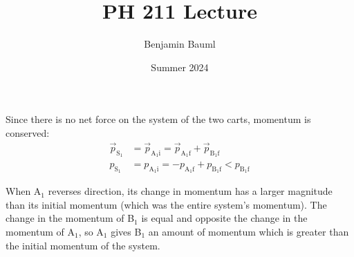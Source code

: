 \documentclass[]{article}
\title{PH 211 Lecture \Week}
\author{Benjamin Bauml}
\date{Summer 2024}
\begin{document}
\begin{TeacherMargin}
\noindent Since there is no net force on the system of the two carts, momentum is conserved:
\begin{align*}
	\vec{p}_{\text{S}_{1}} & = \vec{p}_{\text{A}_{1}\text{i}} = \vec{p}_{\text{A}_{1}\text{f}} + \vec{p}_{\text{B}_{1}\text{f}} \\
	p_{\text{S}_{1}} & = p_{\text{A}_{1}\text{i}} = -p_{\text{A}_{1}\text{f}} + p_{\text{B}_{1}\text{f}} < p_{\text{B}_{1}\text{f}}
\end{align*}
\begin{comment}
	\vec{p}_{f} & = \vec{p}_{i} \\
	\left(m_{\text{B}_{1}}v_{\text{B}_{1}\text{f}}-m_{\text{A}_{1}}v_{\text{A}_{1}\text{f}}\right)\hat{x} & = m_{\text{A}_{1}}v_{\text{A}_{1}\text{i}} \hat{x} \\
	m_{\text{B}_{1}}v_{\text{B}_{1}\text{f}} & = m_{\text{A}_{1}}v_{\text{A}_{1}\text{f}} + m_{\text{A}_{1}}v_{\text{A}_{1}\text{i}} \\
	p_{\text{B}_{1}\text{f}} = m_{\text{B}_{1}}v_{\text{B}_{1}\text{f}} & > m_{\text{A}_{1}}v_{\text{A}_{1}\text{i}} = p_{\text{S}_{1}}.
\end{comment}
When A$_{1}$ reverses direction, its change in momentum has a larger magnitude than its initial momentum (which was the entire system's momentum). The change in the momentum of B$_{1}$ is equal and opposite the change in the momentum of A$_{1}$, so A$_{1}$ gives B$_{1}$ an amount of momentum which is greater than the initial momentum of the system.
\end{TeacherMargin}
\end{document}
